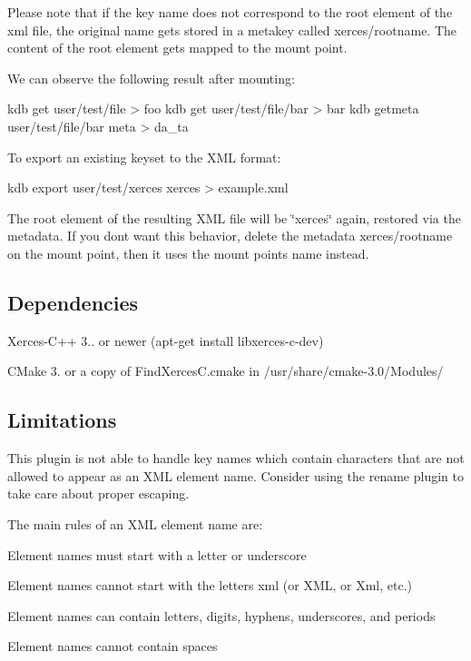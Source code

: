 Please note that if the key name does not correspond to the root element of the xml file, the original name gets stored in a metakey called {\ttfamily xerces/rootname}. The content of the root element gets mapped to the mount point.

We can observe the following result after mounting\+: \begin{DoxyVerb}kdb get user/test/file > foo
kdb get user/test/file/bar > bar
kdb getmeta user/test/file/bar meta > da_ta
\end{DoxyVerb}


To export an existing keyset to the X\+ML format\+: \begin{DoxyVerb}kdb export user/test/xerces xerces > example.xml
\end{DoxyVerb}


The root element of the resulting X\+ML file will be \char`\"{}xerces\char`\"{} again, restored via the metadata. If you don\textquotesingle{}t want this behavior, delete the metadata {\ttfamily xerces/rootname} on the mount point, then it uses the mount point\textquotesingle{}s name instead.

\subsection*{Dependencies}


\begin{DoxyItemize}
\item {\ttfamily Xerces-\/\+C++ 3..} or newer ({\ttfamily apt-\/get install libxerces-\/c-\/dev})
\item C\+Make 3. or a copy of {\ttfamily Find\+Xerces\+C.\+cmake} in {\ttfamily /usr/share/cmake-\/3.0/\+Modules/}
\end{DoxyItemize}

\subsection*{Limitations}

This plugin is not able to handle key names which contain characters that are not allowed to appear as an X\+ML element name. Consider using the rename plugin to take care about proper escaping.

The main rules of an X\+ML element name are\+:


\begin{DoxyItemize}
\item Element names must start with a letter or underscore
\item Element names cannot start with the letters xml (or X\+ML, or Xml, etc.)
\item Element names can contain letters, digits, hyphens, underscores, and periods
\item Element names cannot contain spaces
\end{DoxyItemize}

